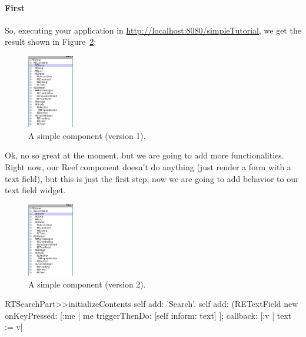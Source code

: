 \documentclass[a4paper,10pt,twoside]{book}
\begin{document}
\paragraph{First }

So, executing your application in \url{http://localhost:8080/simpleTutorial}, we get the result shown in Figure~\ref{first}:

\begin{figure}[h]
\begin{center}
\includegraphics[width=2cm]{REViewHierarchy}
\caption{A simple component (version 1).\label{first}}
\end{center}
\end{figure}

Ok, no so great at the moment, but we are going to add more functionalities.
Right now, our Reef component doesn't do anything (just render a form with a text field), but this is 
just the first step, now we are going to add behavior to our text field widget.


\begin{figure}[h]
\begin{center}
\includegraphics[width=2cm]{REViewHierarchy}
\caption{A simple component (version 2).\label{first}}
\end{center}
\end{figure}

\begin{code}{}
RTSearchPart>>initializeContents
	self add: 'Search'.
	self add: (RETextField new
		onKeyPressed: [:me | me triggerThenDo: [self inform: text] ];
		callback: [:v | text := v]
\end{code}

\end{document}

